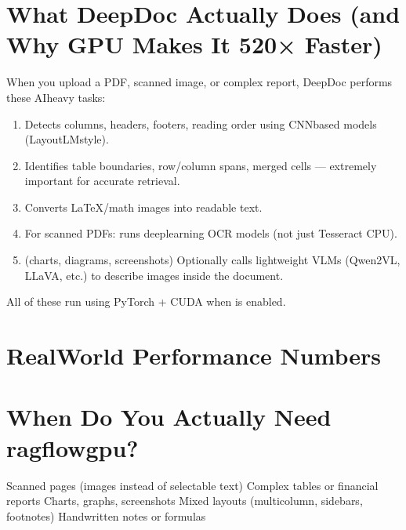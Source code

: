 \documentclass[letterpaper,10pt,english]{sphinxmanual}
\begin{document}
\section{What DeepDoc Actually Does (and Why GPU Makes It 5\textendash{}20× Faster)}
\label{\detokenize{ragflow-gpu-cpu:what-deepdoc-actually-does-and-why-gpu-makes-it-520-faster}}
\sphinxAtStartPar
When you upload a PDF, scanned image, or complex report, DeepDoc performs these AI\sphinxhyphen{}heavy tasks:
\begin{enumerate}
%
\item {} 
\sphinxAtStartPar
{}
Detects columns, headers, footers, reading order using CNN\sphinxhyphen{}based models (LayoutLM\sphinxhyphen{}style).

\item {} 
\sphinxAtStartPar
{}
Identifies table boundaries, row/column spans, merged cells — extremely important for accurate retrieval.

\item {} 
\sphinxAtStartPar
{}
Converts LaTeX/math images into readable text.

\item {} 
\sphinxAtStartPar
{}
For scanned PDFs: runs deep\sphinxhyphen{}learning OCR models (not just Tesseract CPU).

\item {} 
\sphinxAtStartPar
{} (charts, diagrams, screenshots)
Optionally calls lightweight VLMs (Qwen2\sphinxhyphen{}VL, LLaVA, etc.) to describe images inside the document.

\end{enumerate}

\sphinxAtStartPar
All of these run  using PyTorch + CUDA when  is enabled.


\section{Real\sphinxhyphen{}World Performance Numbers}
\label{\detokenize{ragflow-gpu-cpu:real-world-performance-numbers}}

\section{When Do You Actually Need ragflow\sphinxhyphen{}gpu?}
\label{\detokenize{ragflow-gpu-cpu:when-do-you-actually-need-ragflow-gpu}}
\sphinxAtStartPar
{}
\sphinxhyphen{} Scanned pages (images instead of selectable text)
\sphinxhyphen{} Complex tables or financial reports
\sphinxhyphen{} Charts, graphs, screenshots
\sphinxhyphen{} Mixed layouts (multi\sphinxhyphen{}column, sidebars, footnotes)
\sphinxhyphen{} Handwritten notes or formulas
\end{document}

